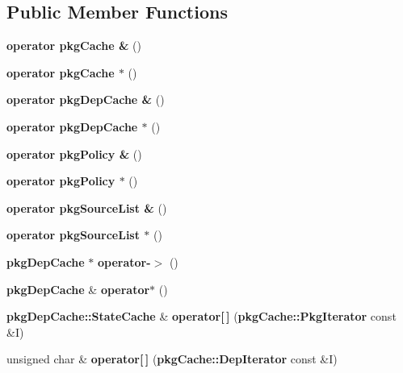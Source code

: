 \subsection*{\-Public \-Member \-Functions}
\begin{DoxyCompactItemize}
\item 
{\bfseries operator pkg\-Cache \&} ()\label{classpkgCacheFile_a08cfc55b07758c6a3419691c47800471}

\item 
{\bfseries operator pkg\-Cache $\ast$} ()\label{classpkgCacheFile_a728a4a05b882103e11e2fee3e3b8c813}

\item 
{\bfseries operator pkg\-Dep\-Cache \&} ()\label{classpkgCacheFile_ad42e955d9ecb7a2de0c8450694fc4cdd}

\item 
{\bfseries operator pkg\-Dep\-Cache $\ast$} ()\label{classpkgCacheFile_aeff27b91c41808b55251eae73a37fb2b}

\item 
{\bfseries operator pkg\-Policy \&} ()\label{classpkgCacheFile_a01101577df0829bb7a3d315d5014f820}

\item 
{\bfseries operator pkg\-Policy $\ast$} ()\label{classpkgCacheFile_a49b3ee9bb477740de07fbb8818d7b8b2}

\item 
{\bfseries operator pkg\-Source\-List \&} ()\label{classpkgCacheFile_af1ce8a8111bf1a2139e4b1878c8622fb}

\item 
{\bfseries operator pkg\-Source\-List $\ast$} ()\label{classpkgCacheFile_aaf2523bf4ff15eb0c55b58aeeb6c9b8e}

\item 
{\bf pkg\-Dep\-Cache} $\ast$ {\bfseries operator-\/$>$} ()\label{classpkgCacheFile_a1a59779e7145d664811cb1e4f5f25100}

\item 
{\bf pkg\-Dep\-Cache} \& {\bfseries operator$\ast$} ()\label{classpkgCacheFile_a584ffeef1be3f32b171e6edf6489706b}

\item 
{\bf pkg\-Dep\-Cache\-::\-State\-Cache} \& {\bfseries operator[$\,$]} ({\bf pkg\-Cache\-::\-Pkg\-Iterator} const \&\-I)\label{classpkgCacheFile_a4b9c29f69a0e4b4d2f19263341033a31}

\item 
unsigned char \& {\bfseries operator[$\,$]} ({\bf pkg\-Cache\-::\-Dep\-Iterator} const \&\-I)\label{classpkgCacheFile_ad87abad344e372110dfc134f5bb38bb1}


\end{DoxyCompactItemize}

